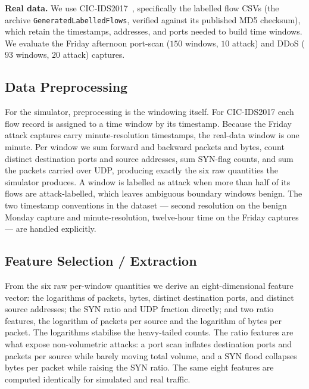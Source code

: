 \documentclass[11pt,a4paper]{article}
\newcommand{\code}[1]{\texttt{#1}}
\begin{document}
\textbf{Real data.} We use CIC-IDS2017~\cite{cicids}, specifically the labelled
flow CSVs (the archive \code{GeneratedLabelledFlows}, verified against its
published MD5 checksum), which retain the timestamps, addresses, and ports needed
to build time windows. We evaluate the Friday afternoon port-scan ($150$ windows,
$10$ attack) and DDoS ($93$ windows, $20$ attack) captures.

\subsection{Data Preprocessing}
For the simulator, preprocessing is the windowing itself. For CIC-IDS2017 each
flow record is assigned to a time window by its timestamp. Because the Friday
attack captures carry minute-resolution timestamps, the real-data window is one
minute. Per window we sum forward and backward packets and bytes, count distinct
destination ports and source addresses, sum SYN-flag counts, and sum the packets
carried over UDP, producing exactly the six raw quantities the simulator produces.
A window is labelled as attack when more than half of its flows are
attack-labelled, which leaves ambiguous boundary windows benign. The two timestamp
conventions in the dataset --- second resolution on the benign Monday capture and
minute-resolution, twelve-hour time on the Friday captures --- are handled
explicitly.

\subsection{Feature Selection / Extraction}
From the six raw per-window quantities we derive an eight-dimensional feature
vector: the logarithms of packets, bytes, distinct destination ports, and distinct
source addresses; the SYN ratio and UDP fraction directly; and two ratio features,
the logarithm of packets per source and the logarithm of bytes per packet. The
logarithms stabilise the heavy-tailed counts. The ratio features are what expose
non-volumetric attacks: a port scan inflates destination ports and packets per
source while barely moving total volume, and a SYN flood collapses bytes per
packet while raising the SYN ratio. The same eight features are computed
identically for simulated and real traffic.
\end{document}
